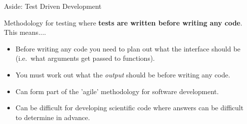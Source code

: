 \documentclass[ignorenonframetext,]{beamer}
\providecommand{\tightlist}{%
  \setlength{\itemsep}{0pt}\setlength{\parskip}{0pt}}
\begin{document}
\begin{frame}{Aside: Test Driven Development}

Methodology for testing where \textbf{tests are written before writing
any code}. This means....
\begin{itemize}
\tightlist
\item
  Before writing any code you need to plan out what the interface should
  be (i.e.~what arguments get passed to functions).
\item
  You must work out what the \emph{output} should be before writing any
  code.
\item
  Can form part of the 'agile' methodology for software development.
\item
  Can be difficult for developing scientific code where answers can be
  difficult to determine in advance.
\end{itemize}
\end{frame}
\end{document}
